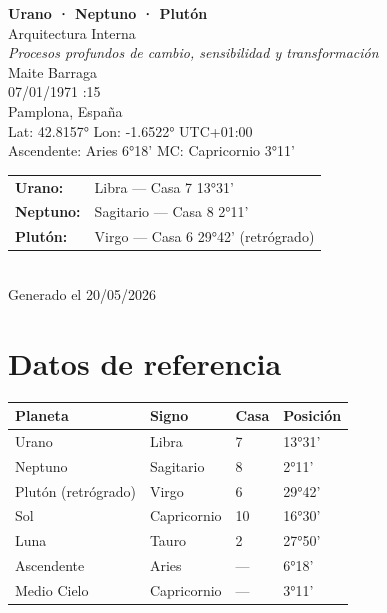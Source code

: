 \documentclass[11pt,a4paper]{article}
\begin{document}
\begin{titlepage}
  \centering
  \vspace*{1.5cm}
  {\Huge\bfseries\color{azulai} Urano · Neptuno · Plutón}\\[0.5cm]
  {\large\color{grisai} Arquitectura Interna}\\[0.3cm]
  {\small\itshape\color{grisai} Procesos profundos de cambio, sensibilidad y transformación}\\[2cm]
  {\huge\color{doradoai} Maite Barraga}\\[1.5cm]
  {\Large 07/01/1971 :15}\\[0.3cm]
  {\Large Pamplona, España}\\[0.3cm]
  {\normalsize Lat: 42.8157° \quad Lon: -1.6522° \quad UTC+01:00}\\[0.3cm]
  {\normalsize Ascendente: Aries 6°18' \quad
    MC: Capricornio 3°11'}\\[2cm]
  \begin{tabular}{ll}
    \textbf{Urano:}   & Libra — Casa 7 13°31'  \\
    \textbf{Neptuno:} & Sagitario — Casa 8 2°11' \\
    \textbf{Plutón:}  & Virgo — Casa 6 29°42' (retrógrado) \\
  \end{tabular}\\[2cm]
  \vfill
  {\small Generado el 20/05/2026}
\end{titlepage}

\tableofcontents
\newpage

\section{Datos de referencia}

\begin{center}
\begin{tabular}{llll}
  \toprule
  \textbf{Planeta} & \textbf{Signo} & \textbf{Casa} & \textbf{Posición} \\
  \midrule
  Urano    & Libra   & 7   & 13°31'  \\
  Neptuno & Sagitario  & 8  & 2°11' \\
  Plutón (retrógrado)  & Virgo  & 6  & 29°42' \\
  Sol              & Capricornio  & 10  & 16°30' \\
  Luna             & Tauro & 2 & 27°50' \\
  Ascendente       & Aries          & ---                   & 6°18' \\
  Medio Cielo      & Capricornio           & ---                   & 3°11' \\
  \bottomrule
\end{tabular}
\end{center}
\end{document}
